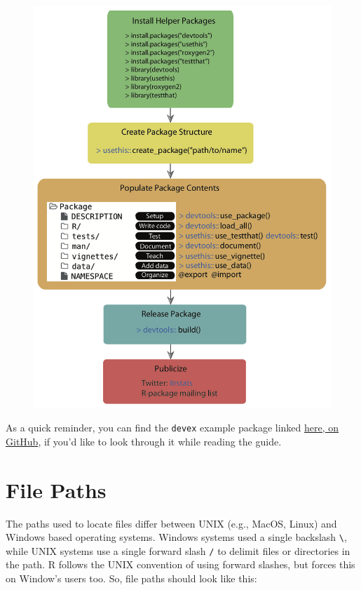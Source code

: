 \documentclass[]{book}
\begin{document}
\begin{figure}
\centering
\includegraphics{images/package_workflow2.png}
\caption{}
\end{figure}

As a quick reminder, you can find the \texttt{devex} example package
linked \href{https://github.com/IQSS/Rbuild/tree/master/devex}{here, on
GitHub}, if you'd like to look through it while reading the guide.

\section{File Paths}\label{file-paths}

The paths used to locate files differ between UNIX (e.g., MacOS, Linux)
and Windows based operating systems. Windows systems used a single
backslash \texttt{\textbackslash{}}, while UNIX systems use a single
forward slash \texttt{/} to delimit files or directories in the path. R
follows the UNIX convention of using forward slashes, but forces this on
Window's users too. So, file paths should look like this:
\end{document}
